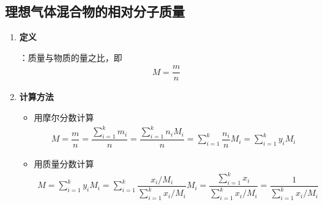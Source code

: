 \subsection{理想气体混合物的相对分子质量}
\begin{enumerate}[1.]
	\item \textbf{定义}
	
		：质量与物质的量之比，即
		\begin{align}
			M = \dfrac{m}{n}
		\end{align}
		
	\item \textbf{计算方法}
	\begin{itemize}
		\item 用摩尔分数计算
		\begin{align}
			M = \dfrac{m}{n} = \dfrac{\displaystyle \sum_{i = 1}^k m_i}{n} = \dfrac{\displaystyle \sum_{i = 1}^k n_iM_i}{n} = \sum_{i = 1}^k \dfrac{n_i}{n}M_i = \sum_{i = 1}^k y_iM_i
		\end{align}
		
		\item 用质量分数计算
		\begin{align}
			M = \sum_{i = 1}^k y_iM_i = \sum_{i = 1}^k \dfrac{x_i / M_i}{\displaystyle \sum_{i = 1}^k x_i / M_i} M_i = \dfrac{\displaystyle \sum_{i = 1}^k x_i}{\displaystyle \sum_{i = 1}^k x_i /M_i} = \dfrac{1}{\displaystyle \sum_{i = 1}^k x_i /M_i}
		\end{align}
	\end{itemize}
\end{enumerate}

